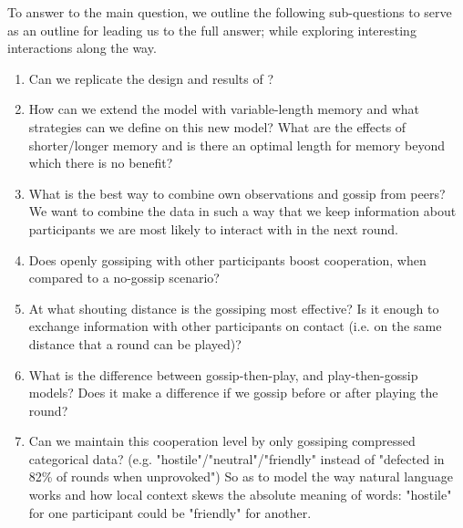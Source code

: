 \documentclass[english]{article}
\begin{document}
To answer to the main question, we outline the following sub-questions to serve as an outline for leading us to the full answer; while exploring interesting interactions along the way.
\begin{enumerate}
  \item Can we replicate the design and results of \citet{smaldino}?
  \item How can we extend the model with variable-length memory and what strategies can we define on this new model? What are the effects of shorter/longer memory and is there an optimal length for memory beyond which there is no benefit?
  \item What is the best way to combine own observations and gossip from peers? We want to combine the data in such a way that we keep information about participants we are most likely to interact with in the next round.
  \item Does openly gossiping with other participants boost cooperation, when compared to a no-gossip scenario?
  \item At what shouting distance is the gossiping most effective? Is it enough to exchange information with other participants on contact (i.e. on the same distance that a round can be played)?
  \item What is the difference between gossip-then-play, and play-then-gossip models? Does it make a difference if we gossip before or after playing the round?
  \item Can we maintain this cooperation level by only gossiping compressed categorical data? (e.g. "hostile"/"neutral"/"friendly" instead of "defected in 82\% of rounds when unprovoked") So as to model the way natural language works and how local context skews the absolute meaning of words: "hostile" for one participant could be "friendly" for another.
\end{enumerate}
\end{document}
